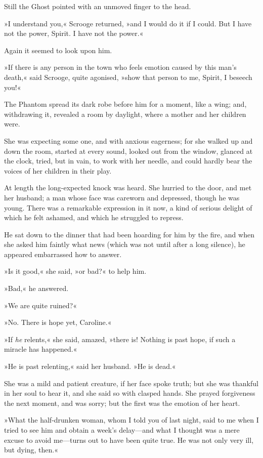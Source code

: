 Still the Ghost pointed with an unmoved finger to the head.

»I understand you,« Scrooge returned, »and I would do it if I could. But I have not the power, Spirit. I have not the power.«

Again it seemed to look upon him.

»If there is any person in the town who feels emotion caused by this man's death,« said Scrooge, quite agonised, »show that person to me, Spirit, I beseech you!«

The Phantom spread its dark robe before him for a moment, like a wing; and, withdrawing it, revealed a room by daylight, where a mother and her children were.

She was expecting some one, and with anxious eagerness; for she walked up and down the room, started at every sound, looked out from the window, glanced at the clock, tried, but in vain, to work with her needle, and could hardly bear the voices of her children in their play.

At length the long-expected knock was heard. She hurried to the door, and met her husband; a man whose face was careworn and depressed, though he was young. There was a remarkable expression in it now, a kind of serious delight of which he felt ashamed, and which he struggled to repress.

He sat down to the dinner that had been hoarding for him by the fire, and when she asked him faintly what news (which was not until after a long silence), he appeared embarrassed how to answer.

»Is it good,« she said, »or bad?« to help him.

»Bad,« he answered.

»We are quite ruined?«

»No. There is hope yet, Caroline.«

»If \textit{he} relents,« she said, amazed, »there is! Nothing is past hope, if such a miracle has happened.«

»He is past relenting,« said her husband. »He is dead.«

She was a mild and patient creature, if her face spoke truth; but she was thankful in her soul to hear it, and she said so with clasped hands. She prayed forgiveness the next moment, and was sorry; but the first was the emotion of her heart.

»What the half-drunken woman, whom I told you of last night, said to me when I tried to see him and obtain a week's delay—and what I thought was a mere excuse to avoid me—turns out to have been quite true. He was not only very ill, but dying, then.«

